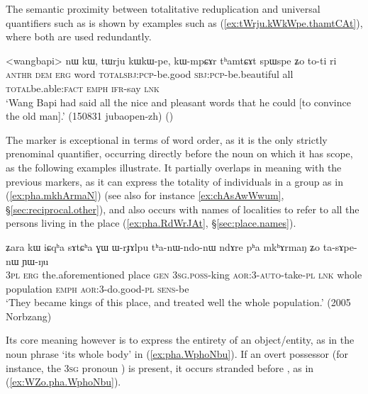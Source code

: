 The semantic proximity between totalitative reduplication and universal quantifiers such as  is shown by examples such as (\ref{ex:tWrju.kWkWpe.thamtCAt}), where both are used redundantly.

\begin{exe}
\ex \label{ex:tWrju.kWkWpe.thamtCAt}
\gll   <wangbapi> nɯ kɯ, tɯrju kɯ\redp{}kɯ-pe, kɯ-mpɕɤr tʰamtɕɤt spɯ\redp{}spe ʑo to-ti ri \\
\textsc{anthr} \textsc{dem} \textsc{erg} word \textsc{total}\redp{}\textsc{sbj}:\textsc{pcp}-be.good \textsc{sbj}:\textsc{pcp}-be.beautiful all \textsc{total}\redp{}be.able:\textsc{fact} \textsc{emph} \textsc{ifr}-say \textsc{lnk} \\
\glt `Wang Bapi had said all the nice and pleasant words that he could [to convince the old man].' (150831 jubaopen-zh)
()
\end{exe}

The marker  is exceptional in terms of word order, as it is the only strictly prenominal quantifier, occurring directly before the noun on which it has scope, as the following examples illustrate. It partially overlaps in meaning with the previous markers, as it can express the totality of individuals in a group as in (\ref{ex:pha.mkhArmaN}) (see also for instance \ref{ex:chAsAwWwum}, §\ref{sec:reciprocal.other}), and also occurs with names of localities to refer to all the persons living in the place (\ref{ex:pha.RdWrJAt}, §\ref{sec:place.names}).

 \begin{exe}
\ex \label{ex:pha.mkhArmaN}
\gll ʑara kɯ iɕqʰa sɤtɕʰa ɣɯ ɯ-rɟɤlpu tʰa-nɯ-ndo-nɯ ndɤre pʰa mkʰɤrmaŋ ʑo ta-sɤpe-nɯ ɲɯ-ŋu \\
\textsc{3pl} \textsc{erg} the.aforementioned place  \textsc{gen} \textsc{3sg}.\textsc{poss}-king \textsc{aor}:3\flobv{}-\textsc{auto}-take-\textsc{pl} \textsc{lnk} whole population \textsc{emph} \textsc{aor}:3\flobv{}-do.good-\textsc{pl} \textsc{sens}-be \\
\glt `They became kings of this place, and treated well the whole population.' (2005 Norbzang)
  \end{exe}
  
Its core meaning however is to express the entirety of an object/entity, as in the noun phrase   `its whole body' in (\ref{ex:pha.WphoNbu}). If an overt possessor (for instance, the \textsc{3sg} pronoun ) is present, it occurs stranded before , as in (\ref{ex:WZo.pha.WphoNbu}).

